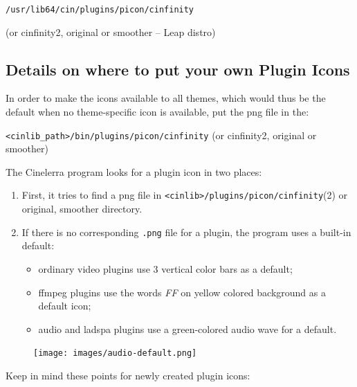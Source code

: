\texttt{/usr/lib64/cin/plugins/picon/cinfinity}

(or cinfinity2, original or smoother -- Leap distro)

\subsection{Details on where to put your own Plugin Icons}%
\label{sub:details_put_plugin_icons}

In order to make the icons available to all themes, which would thus be the default when no theme-specific icon is available, put the png file in the:

\texttt{<cinlib\_path>/bin/plugins/picon/cinfinity} (or cinfinity2, original or smoother)

The Cinelerra program looks for a plugin icon in two places:

\begin{enumerate}
    \item First, it tries to find a png file in \texttt{<cinlib>/plugins/picon/cinfinity}(2) or original, smoother directory.
    \item If there is no corresponding \texttt{.png} file for a plugin, the program uses a built-in default:
    \begin{itemize}
        \item ordinary video plugins use 3 vertical color bars as a default;
        \item ffmpeg plugins use the words \textit{FF} on yellow colored background as a default icon;        
        \item audio and ladspa plugins use a green-colored audio wave for a default.              
    \end{itemize}
\end{enumerate}
\begin{figure}[htpb]          
    \centering
    \texttt{[image: images/audio-default.png]} 
\end{figure} 

Keep in mind these points for newly created plugin icons:

